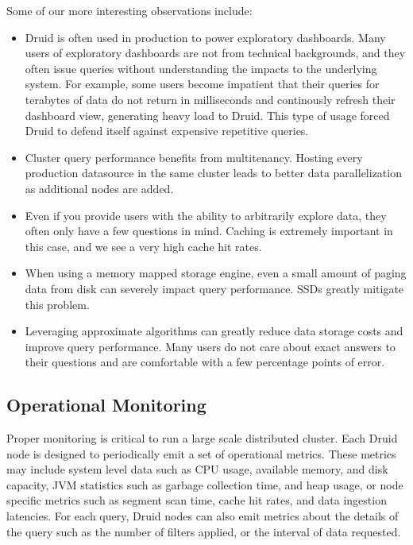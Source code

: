 \documentclass{acm_proc_article-sp}
\begin{document}
Some of our more interesting observations include:
\begin{itemize}
\item Druid is often used in production to power exploratory dashboards.  Many
users of exploratory dashboards are not from technical backgrounds, and they
often issue queries without understanding the impacts to the underlying system.
For example, some users become impatient that their queries for terabytes of
data do not return in milliseconds and continously refresh their dashboard
view, generating heavy load to Druid. This type of usage forced Druid to defend
itself against expensive repetitive queries.

\item Cluster query performance benefits from multitenancy. Hosting every
production datasource in the same cluster leads to better data parallelization
as additional nodes are added.

\item Even if you provide users with the ability to arbitrarily explore data,
they often only have a few questions in mind. Caching is extremely important in
this case, and we see a very high cache hit rates.

\item When using a memory mapped storage engine, even a small amount of paging
data from disk can severely impact query performance. SSDs greatly mitigate
this problem.

\item Leveraging approximate algorithms can greatly reduce data storage costs and
improve query performance. Many users do not care about exact answers to their
questions and are comfortable with a few percentage points of error. 
\end{itemize}

\subsection{Operational Monitoring}
Proper monitoring is critical to run a large scale distributed cluster.
Each Druid node is designed to periodically emit a set of operational metrics.
These metrics may include system level data such as CPU usage, available
memory, and disk capacity, JVM statistics such as garbage collection time, and
heap usage, or node specific metrics such as segment scan time, cache
hit rates, and data ingestion latencies. For each query, Druid nodes can also
emit metrics about the details of the query such as the number of filters
applied, or the interval of data requested.
\end{document}
